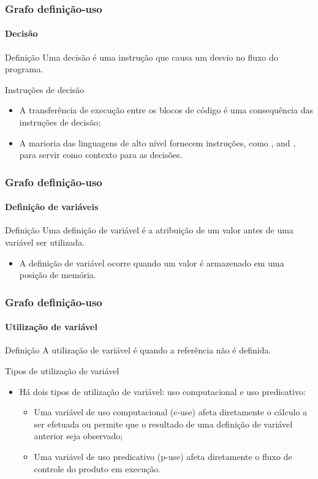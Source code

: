 \begin{frame}
\frametitle{Grafo definição-uso}
\framesubtitle{Decisão}
\label{concept:definition}

\begin{block:concept}{Definição}
Uma decisão é uma instrução que causa um desvio no fluxo do programa.
\end{block:concept}

\begin{block:fact}{Instruções de decisão}
\begin{itemize}
	\item A transferência de execução entre os blocos de código é uma consequência das instruções de decisão;

	\item A marioria das linguagens de alto nível fornecem instruções, como ,
	 and , para servir como contexto para as decisões.
\end{itemize}
\end{block:fact}
\end{frame}


\begin{frame}
\frametitle{Grafo definição-uso}
\framesubtitle{Definição de variáveis}
\label{concept:variable-definition}

\begin{block:concept}{Definição}
Uma definição de variável é a atribuição de um valor antes de uma variável ser utilizada.
\begin{itemize}
	\item A definição de variável ocorre quando um valor é armazenado em uma posição de memória.
\end{itemize}
\end{block:concept}
\end{frame}


\begin{frame}
\frametitle{Grafo definição-uso}
\framesubtitle{Utilização de variável}
\label{concept:variable-use}

\begin{block:concept}{Definição}
A utilização de variável é quando a referência não é definida.
\end{block:concept}

\begin{block:fact}{Tipos de utilização de variável}
\begin{itemize}
	\item Há dois tipos de utilização de variável: uso computacional e uso predicativo:
	\begin{itemize}
		\item Uma variável de uso computacional (c-use) afeta diretamente o cálculo a ser efetuada ou permite que o resultado de uma definição de variável anterior seja observado;

		\item Uma variável de uso predicativo (p-use) afeta diretamente o fluxo de controle do produto em execução.
	\end{itemize}
\end{itemize}
\end{block:fact}
\end{frame}


